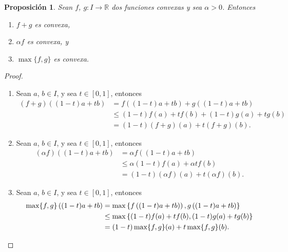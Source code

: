 \documentclass[11pt]{article}
\numberwithin{equation}{section} %
\theoremstyle{plain}                            %
\newtheorem{proposicion}[teorema]{Proposición}
\theoremstyle{definition}                       %
\theoremstyle{remark}                           %
\begin{document}
\begin{proposicion}
      Sean $f$, $g \colon I \rightarrow \mathbb{R}$ dos funciones convexas y
      sea $\alpha>0$. Entonces
      \begin{enumerate}
            \item $f+g$ es convexa,
            \item $\alpha f$ es convexa, y
            \item $\max \{f ,g\}$ es convexa.
      \end{enumerate}
\end{proposicion}
\begin{proof}
      \begin{enumerate}
            \item Sean $a$, $b\in I$, y sea $t\in [0,1]$, entonces
                  \begin{equation}
                        \begin{split}
                              (f+g) \left( (1-t)a+tb \right) & = f \left( (1-t)a+tb \right) + g \left( (1-t)a+tb \right) \\
                                                             & \leq (1-t)f(a)+tf(b)+(1-t)g(a)+t g(b)                     \\
                                                             & = (1-t)(f+g)(a) + t(f+g)(b).
                        \end{split}
                  \end{equation}
            \item Sean $a$, $b\in I$, y sea $t\in [0,1]$, entonces
                  \begin{equation}
                        \begin{aligned}
                              (\alpha f) \left( (1-t)a+tb \right) & = \alpha f \left( (1-t)a+tb \right)     \\
                                                                  & \leq \alpha (1-t)f(a)+ \alpha t f(b)    \\
                                                                  & = (1-t)(\alpha f)(a) + t (\alpha f)(b).
                        \end{aligned}
                  \end{equation}
            \item Sean $a$, $b\in I$, y sea $t\in [0,1]$, entonces
                  \[
                        \begin{aligned}
                              \max \{ f,g\} \left( (1-t)a+tb \right) & = \max \left\{ f\left( (1-t)a+tb) \right),g \left((1-t)a+tb\right) \right\} \\
                                                                     & \leq \max \left\{ (1-t)f(a)+tf(b),(1-t)g(a)+t g(b) \right\}                 \\
                                                                     & = (1-t) \max\{f,g\}(a) + t \max\{ f,g\} (b). \qedhere
                        \end{aligned}
                  \]
      \end{enumerate}
\end{proof}
\end{document}

